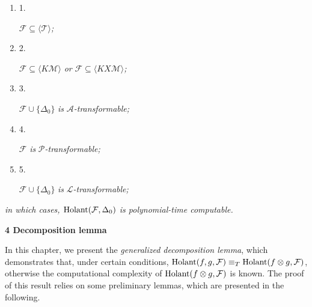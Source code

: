 \begin{enumerate}


\item[] 
1. 


$\mathcal{F}\subseteq\langle\mathcal{T}\rangle$\emph{;}\par





\item[] 
2. 


$\mathcal{F}\subseteq\langle K\mathcal{M}\rangle$\emph{ or }$\mathcal{F}\subseteq\langle KX\mathcal{M}\rangle$\emph{;}\par





\item[] 
3. 


$\mathcal{F}\cup\{\Delta_{0}\}$\emph{ is }$\mathscr{A}$\emph{-transformable;}\par





\item[] 
4. 


$\mathcal{F}$\emph{ is }$\mathscr{P}$\emph{-transformable;}\par





\item[] 
5. 


$\mathcal{F}\cup\{\Delta_{0}\}$\emph{ is }$\mathscr{L}$\emph{-transformable;}\par





\end{enumerate}


\emph{in which cases, $\textup{{Holant}}(\mathcal{F},\Delta_{0})$ is polynomial-time computable.}\par







\par\medskip\noindent\textbf{
4 Decomposition lemma}\par




In this chapter, we present the \emph{generalized decomposition lemma}, which demonstrates that, under certain conditions, $\textup{{Holant}}(f,g,\mathcal{F})\equiv_{T}\textup{{Holant}}(f\otimes g,\mathcal{F})$, otherwise the computational complexity of $\textup{{Holant}}(f\otimes g,\mathcal{F})$ is known. The proof of this result relies on some preliminary lemmas, which are presented in the following.\par



